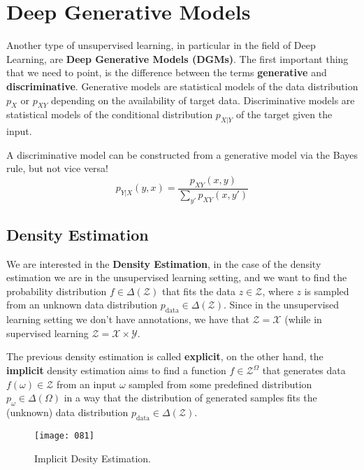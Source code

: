 \chapter{Deep Generative Models}
Another type of unsupervised learning, in particular in the field of Deep Learning, are \textbf{Deep Generative Models (DGMs)}. The first important thing that we need to point, is the difference between the terms \textbf{generative} and \textbf{discriminative}. Generative models are statistical models of the data distribution \(p_X\) or \(p_{XY}\) depending on the availability of target data. Discriminative models are statistical models of the conditional distribution \(p_{X|Y}\) of the target given the input.

A discriminative model can be constructed from a generative model via the Bayes rule, but not vice versa!
\begin{equation}
    p_{Y|X}(y,x) = \frac {p_{XY} (x,y)} {\sum_{y'} p_{XY} (x,y')}
\end{equation}

\section{Density Estimation}
We are interested in the \textbf{Density Estimation}, in the case of the density estimation we are in the unsupervised learning setting, and we want to find the probability distribution \(f \in \Delta(\mathcal{Z})\) that fits the data \(z \in \mathcal{Z}\), where \(z\) is sampled from an unknown data distribution \(p_\text{data} \in \Delta(\mathcal{Z})\). Since in the unsupervised learning setting we don't have annotations, we have that \(\mathcal{Z} = \mathcal{X}\) (while in supervised learning \(\mathcal{Z} = \mathcal{X} \times \mathcal{Y}\).

The previous density estimation is called \textbf{explicit}, on the other hand, the \textbf{implicit} density estimation aims to find a function \(f \in \mathcal{Z}^\Omega\) that generates data \(f(\omega) \in \mathcal{Z}\) from an input \(\omega\) sampled from some predefined distribution \(p_\omega \in \Delta(\Omega)\) in a way that the distribution of generated samples fits the (unknown) data distribution \(p_\text{data} \in \Delta(\mathcal{Z})\).

\begin{figure}[h!]
    \centering
    \texttt{[image: 081]}
    \caption{Implicit Desity Estimation.}
    \label{fig:081}
\end{figure}

